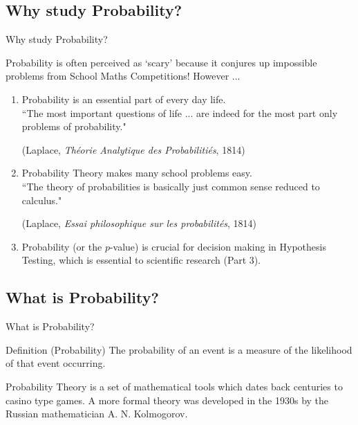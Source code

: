 \documentclass[t,xcolor=pdftex,dvipsnames,table]{beamer}
\begin{document}
\subsection[]{Why study Probability?}
\begin{frame}{Why study Probability?}

Probability is often perceived as ‘scary’ because it conjures up impossible problems from School Maths Competitions! However ...

\begin{enumerate}
\item Probability is an essential part of every day life.  \\
 ``The most important questions of life ... are indeed for the most part only problems of probability."
 
 {\tiny (Laplace, {\it Théorie Analytique des Probabilitiés}, 1814)}
\href{http://bayes.wustl.edu/Manual/laplace_A_philosophical_essay_on_probabilities.pdf}{}

\item 
Probability Theory makes many school problems easy. \\
``The theory of probabilities is basically just common sense reduced to calculus." 

{\tiny (Laplace, {\it Essai philosophique sur les probabilités},  1814)}
\href{http://archive.org/details/essaiphilosophiq00lapluoft}{}

\item Probability (or the $p$-value) is crucial for decision making in Hypothesis Testing, which is essential to scientific research (Part 3).
\end{enumerate}
\end{frame}


\subsection[]{What is Probability?}
\begin{frame}{What is Probability?}

\begin{block}{Definition (Probability)}
The probability of an event is a measure of the likelihood of that event occurring. 
\end{block}


\vspace{.5cm}
Probability Theory is a set of mathematical tools which dates back centuries to casino type games. A more formal theory was developed in the 1930s by the Russian mathematician A. N. Kolmogorov.
\href{http://www.youtube.com/watch?v=2y3PH4SqmlA}{}
\hyperlink{Appendix1}{}
\end{frame}
\end{document}
